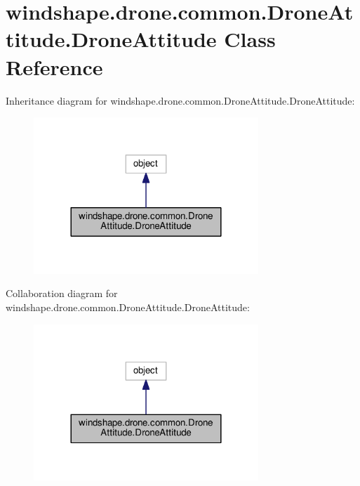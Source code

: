 \hypertarget{classwindshape_1_1drone_1_1common_1_1_drone_attitude_1_1_drone_attitude}{}\section{windshape.\+drone.\+common.\+Drone\+Attitude.\+Drone\+Attitude Class Reference}
\label{classwindshape_1_1drone_1_1common_1_1_drone_attitude_1_1_drone_attitude}


Inheritance diagram for windshape.\+drone.\+common.\+Drone\+Attitude.\+Drone\+Attitude\+:\nopagebreak
\begin{figure}[H]
\begin{center}
\leavevmode
\includegraphics[width=240pt]{classwindshape_1_1drone_1_1common_1_1_drone_attitude_1_1_drone_attitude__inherit__graph}
\end{center}
\end{figure}


Collaboration diagram for windshape.\+drone.\+common.\+Drone\+Attitude.\+Drone\+Attitude\+:\nopagebreak
\begin{figure}[H]
\begin{center}
\leavevmode
\includegraphics[width=240pt]{classwindshape_1_1drone_1_1common_1_1_drone_attitude_1_1_drone_attitude__coll__graph}
\end{center}
\end{figure}

